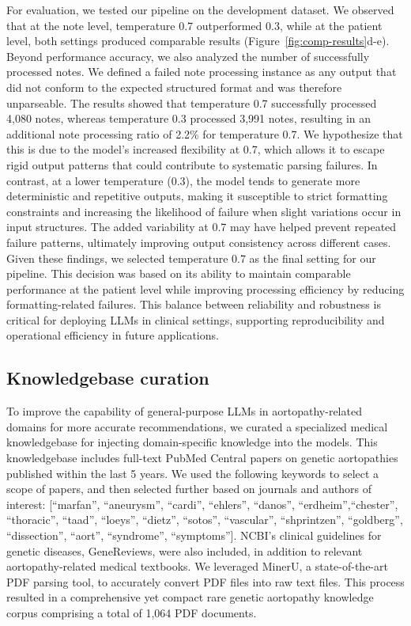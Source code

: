 \documentclass[fleqn,10pt]{wlscirep}
\begin{document}
For evaluation, we tested our pipeline on the development dataset. We observed that at the note level, temperature 0.7 outperformed 0.3, while at the patient level, both settings produced comparable results (Figure~\ref{fig:comp-results}d-e). Beyond performance accuracy, we also analyzed the number of successfully processed notes. We defined a failed note processing instance as any output that did not conform to the expected structured format and was therefore unparseable. The results showed that temperature 0.7 successfully processed 4,080 notes, whereas temperature 0.3 processed 3,991 notes, resulting in an additional note processing ratio of 2.2\% for temperature 0.7. We hypothesize that this is due to the model's increased flexibility at 0.7, which allows it to escape rigid output patterns that could contribute to systematic parsing failures. In contrast, at a lower temperature (0.3), the model tends to generate more deterministic and repetitive outputs, making it susceptible to strict formatting constraints and increasing the likelihood of failure when slight variations occur in input structures. The added variability at 0.7 may have helped prevent repeated failure patterns, ultimately improving output consistency across different cases. Given these findings, we selected temperature 0.7 as the final setting for our pipeline. This decision was based on its ability to maintain comparable performance at the patient level while improving processing efficiency by reducing formatting-related failures. This balance between reliability and robustness is critical for deploying LLMs in clinical settings, supporting reproducibility and operational efficiency in future applications.


\subsection*{Knowledgebase curation}
To improve the capability of general-purpose LLMs in aortopathy-related domains for more accurate recommendations, we curated a specialized medical knowledgebase for injecting domain-specific knowledge into the models. This knowledgebase includes full-text PubMed Central papers on genetic aortopathies published within the last 5 years. We used the following keywords to select a scope of papers, and then selected further based on journals and authors of interest: [``marfan'', ``aneurysm'', ``cardi'', ``ehlers'', ``danos'', ``erdheim'',``chester'', ``thoracic'', ``taad'', ``loeys'', ``dietz'', ``sotos'', ``vascular'', ``shprintzen'', ``goldberg'', ``dissection'', ``aort'', ``syndrome'', ``symptoms''].  NCBI’s clinical guidelines for genetic diseases, GeneReviews, were also included, in addition to relevant aortopathy-related medical textbooks. We leveraged MinerU,\cite{wang2024mineru} a state-of-the-art PDF parsing tool, to accurately convert PDF files into raw text files. This process resulted in a comprehensive yet compact rare genetic aortopathy knowledge corpus comprising a total of 1,064 PDF documents.
\end{document}
